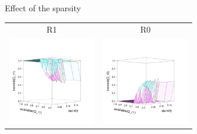 \documentclass[8pt, handout=show,notes=show]{beamer}
\begin{document}
\begin{frame}{Effect of the sparsity}
\renewcommand{\imgSize}{3.8cm}

\begin{table}[H]
\centering
\begin{tabular}{cc}
R1 & R0\\
 \includegraphics[width=\imgSize]{images/R1_median}&\includegraphics[width=\imgSize]{images/R0_median}\\

\end{tabular}
\end{table}
\end{frame}
\end{document}
